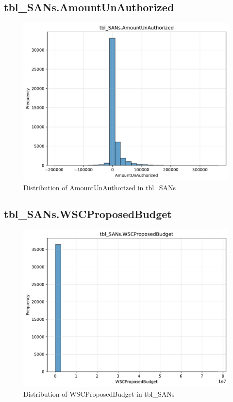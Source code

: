 \subsection{tbl\_SANs.AmountUnAuthorized}

\begin{figure}[htbp]
\centering
\includegraphics[width=\textwidth]{figures/dbo_tbl_SANs_AmountUnAuthorized.pdf}
\caption{Distribution of AmountUnAuthorized in tbl\_SANs}
\end{figure}\newpage

\subsection{tbl\_SANs.WSCProposedBudget}

\begin{figure}[htbp]
\centering
\includegraphics[width=\textwidth]{figures/dbo_tbl_SANs_WSCProposedBudget.pdf}
\caption{Distribution of WSCProposedBudget in tbl\_SANs}
\end{figure}\newpage

